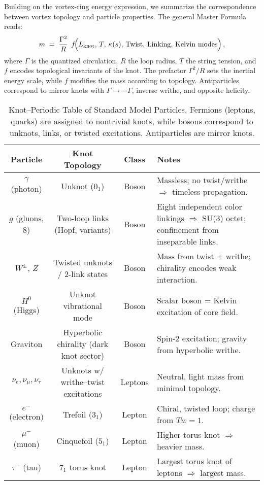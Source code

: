 \documentclass[12pt]{article}
\begin{document}
Building on the vortex-ring energy expression, we summarize the correspondence between vortex topology and particle properties. The general Master Formula reads:
\begin{equation}
m \;=\; \frac{\Gamma^2}{R}\;\,f\!\Big(L_{\rm knot},\,T,\,\kappa(s),\,\mathrm{Twist},\,\mathrm{Linking},\,\mathrm{Kelvin~modes}\Big)\,,
\label{eq:master}
\end{equation}
where $\Gamma$ is the quantized circulation, $R$ the loop radius, $T$ the string tension, and $f$ encodes topological invariants of the knot. The prefactor $\Gamma^2/R$ sets the inertial energy scale, while $f$ modifies the mass according to topology. Antiparticles correspond to mirror knots with $\Gamma \to -\Gamma$, inverse writhe, and opposite helicity.

\begin{table}[h]
\centering
\caption{Knot--Periodic Table of Standard Model Particles. Fermions (leptons, quarks) are assigned to nontrivial knots, while bosons correspond to unknots, links, or twisted excitations. Antiparticles are mirror knots.}
\label{tab:knot_periodic}
\begin{tabular}{|c|c|c|p{7.5cm}|}
\hline
\textbf{Particle} & \textbf{Knot Topology} & \textbf{Class} & \textbf{Notes} \\
\hline
$\gamma$ (photon) & Unknot ($0_1$) & Boson & Massless; no twist/writhe $\Rightarrow$ timeless propagation. \\
$g$ (gluons, 8) & Two-loop links (Hopf, variants) & Boson & Eight independent color linkings $\Rightarrow$ SU(3) octet; confinement from inseparable links. \\
$W^\pm$, $Z$ & Twisted unknots / 2-link states & Boson & Mass from twist + writhe; chirality encodes weak interaction. \\
$H^0$ (Higgs) & Unknot vibrational mode & Boson & Scalar boson = Kelvin excitation of core field. \\
Graviton & Hyperbolic chirality (dark knot sector) & Boson & Spin-2 excitation; gravity from hyperbolic writhe. \\
\hline
$\nu_e,\nu_\mu,\nu_\tau$ & Unknots w/ writhe--twist excitations & Leptons & Neutral, light mass from minimal topology. \\
$e^-$ (electron) & Trefoil ($3_1$) & Lepton & Chiral, twisted loop; charge from $Tw=1$. \\
$\mu^-$ (muon) & Cinquefoil ($5_1$) & Lepton & Higher torus knot $\Rightarrow$ heavier mass. \\
$\tau^-$ (tau) & $7_1$ torus knot & Lepton & Largest torus knot of leptons $\Rightarrow$ largest mass. \\

\end{tabular}
\end{table}
\end{document}
